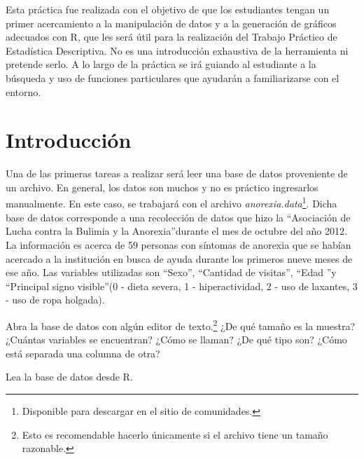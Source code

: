 \documentclass{../prob}
\begin{document}
\maketitle

Esta práctica fue realizada con el objetivo de que los estudiantes tengan un primer acercamiento a la manipulación de datos y a la generación de gráficos adecuados con R, que les será útil para la realización del Trabajo Práctico de Estadística Descriptiva. No es una introducción exhaustiva de la herramienta ni pretende serlo. A lo largo de la práctica se irá guiando al estudiante a la búsqueda y uso de funciones particulares que ayudarán a familiarizarse con el entorno.

\section*{Introducción}
    \begin{problema}
	Una de las primeras tareas a realizar será leer una base de datos proveniente de un archivo. En general, los datos son muchos y no es práctico ingresarlos manualmente. En este caso, se trabajará con el archivo \textit{anorexia.data}\footnote{Disponible para descargar en el sitio de comunidades.}. Dicha base de datos corresponde a una recolección de datos que hizo la \textquotedblleft Asociación de Lucha contra la Bulimia y la Anorexia\textquotedblright durante el mes de octubre del año 2012. La información es acerca de 59 personas con síntomas de anorexia que se habían acercado a la institución en busca de ayuda durante los primeros nueve meses de ese año. Las variables utilizadas son \textquotedblleft Sexo\textquotedblright, \textquotedblleft Cantidad de visitas\textquotedblright , \textquotedblleft Edad \textquotedblright y \textquotedblleft Principal signo visible\textquotedblright (0 - dieta severa, 1 - hiperactividad, 2 - uso de laxantes, 3 - uso de ropa holgada).
	
	\begin{parte}
    	Abra la base de datos con algún editor de texto.\footnote{Esto es recomendable hacerlo únicamente si el archivo tiene un tamaño razonable.} ¿De qué tamaño es la muestra? ¿Cuántas variables se encuentran? ¿Cómo se llaman? ¿De qué tipo son? ¿Cómo está separada una columna de otra?
    \end{parte}
 
	\begin{parte}
    	Lea la base de datos desde R. \\
		
		\noindent{}	

    \end{parte}
        	
    \end{problema}
\end{document}
